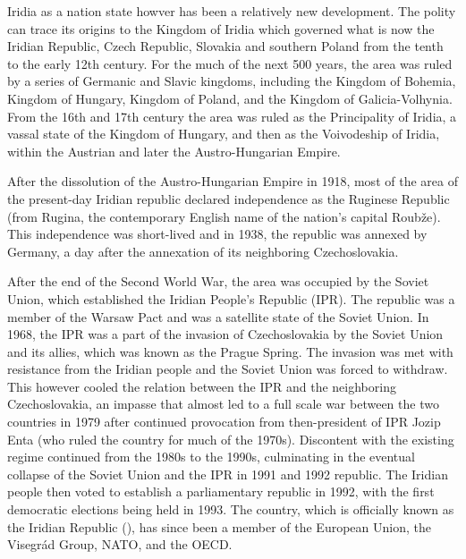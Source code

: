 Iridia as a nation state howver has been a relatively new development. The polity can trace its origins to the Kingdom of Iridia which governed what is now the Iridian Republic, Czech Republic, Slovakia and southern Poland from the tenth to the early 12th century. For the much of the next 500 years, the area was ruled by a series of Germanic and Slavic kingdoms, including the Kingdom of Bohemia, Kingdom of Hungary, Kingdom of Poland, and the Kingdom of Galicia-Volhynia. From the 16th and 17th century the area was ruled as the Principality of Iridia, a vassal state of the Kingdom of Hungary, and then as the Voivodeship of Iridia, within the Austrian and later the Austro-Hungarian Empire.

After the dissolution of the Austro-Hungarian Empire in 1918, most of the area of the present-day Iridian republic declared independence as the Ruginese Republic (from Rugina, the contemporary English name of the nation's capital Roubže). This independence was short-lived and in 1938, the republic was annexed by Germany, a day after the annexation of its neighboring Czechoslovakia.

After the end of the Second World War, the area was occupied by the Soviet Union, which established the Iridian People's Republic (IPR). The republic was a member of the Warsaw Pact and was a satellite state of the Soviet Union. In 1968, the IPR was a part of the invasion of Czechoslovakia by the Soviet Union and its allies, which was known as the Prague Spring. The invasion was met with resistance from the Iridian people and the Soviet Union was forced to withdraw. This however cooled the relation between the IPR and the neighboring Czechoslovakia, an impasse that almost led to a full scale war between the two countries in 1979 after continued provocation from then-president of IPR Jozip Enta (who ruled the country for much of the 1970s). Discontent with the existing regime continued from the 1980s to the 1990s, culminating in the eventual collapse of the Soviet Union and the IPR in 1991 and 1992 republic. The Iridian people then voted to establish a parliamentary republic in 1992, with the first democratic elections being held in 1993. The country, which is officially known as the Iridian Republic (), has since been a member of the European Union, the Visegrád Group, NATO, and the OECD.

